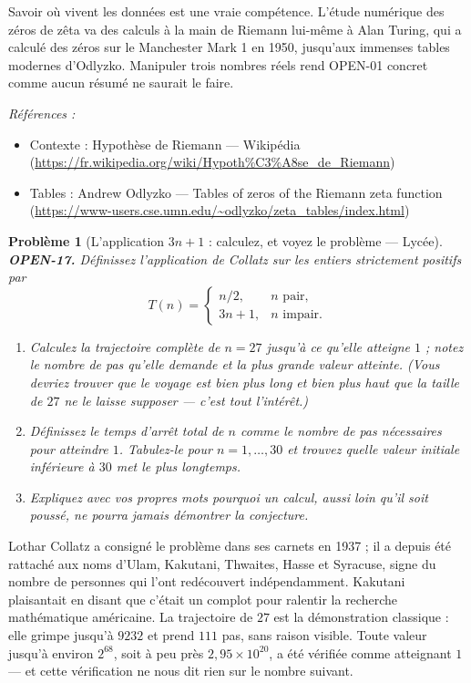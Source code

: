 \documentclass[11pt]{article}
\newtheorem{problem}{Problème}
\newenvironment{refs}{\par\small\noindent\emph{Références :}\begin{itemize}\setlength\itemsep{0pt}}{\end{itemize}\normalsize}
\begin{document}
\noindent Savoir où vivent les données est une vraie compétence. L'étude
numérique des zéros de zêta va des calculs à la main de Riemann lui-même à Alan Turing,
qui a calculé des zéros sur le Manchester Mark 1 en 1950, jusqu'aux immenses tables
modernes d'Odlyzko. Manipuler trois nombres réels rend OPEN-01 concret comme aucun résumé
ne saurait le faire.

\begin{refs}
\item Contexte : Hypothèse de Riemann --- Wikipédia (\url{https://fr.wikipedia.org/wiki/Hypoth%C3%A8se_de_Riemann})
\item Tables : Andrew Odlyzko --- Tables of zeros of the Riemann zeta function (\url{https://www-users.cse.umn.edu/~odlyzko/zeta_tables/index.html})
\end{refs}

\bigskip

\begin{problem}[{L'application $ 3n+1 $ : calculez, et voyez le problème --- Lycée}]
\textbf{OPEN-17.} Définissez l'application de Collatz sur les entiers strictement
positifs par
\[ T(n) = \begin{cases} n/2, & n \text{ pair},\\ 3n+1, & n \text{ impair}.\end{cases} \]
\begin{enumerate}
\item[(a)] Calculez la trajectoire complète de $ n = 27 $ jusqu'à ce qu'elle atteigne $ 1 $ ;
notez le nombre de pas qu'elle demande et la plus grande valeur atteinte. (Vous devriez
trouver que le voyage est bien plus long et bien plus haut que la taille de $ 27 $ ne le
laisse supposer --- c'est tout l'intérêt.)
\item[(b)] Définissez le \textit{temps d'arrêt total} de $ n $ comme le nombre de pas nécessaires
pour atteindre $ 1 $. Tabulez-le pour $ n = 1, \dots, 30 $ et trouvez quelle valeur
initiale inférieure à $ 30 $ met le plus longtemps.
\item[(c)] Expliquez avec vos propres mots pourquoi un calcul, aussi loin qu'il soit poussé, ne
pourra jamais démontrer la conjecture.
\end{enumerate}

\end{problem}

\noindent Lothar Collatz a consigné le problème dans ses carnets en 1937 ; il a
depuis été rattaché aux noms d'Ulam, Kakutani, Thwaites, Hasse et Syracuse, signe du
nombre de personnes qui l'ont redécouvert indépendamment. Kakutani plaisantait en disant
que c'était un complot pour ralentir la recherche mathématique américaine. La trajectoire
de $ 27 $ est la démonstration classique : elle grimpe jusqu'à $ 9232 $ et prend
$ 111 $ pas, sans raison visible. Toute valeur jusqu'à environ $ 2^{68} $, soit à peu
près $ 2{,}95 \times 10^{20} $, a été vérifiée comme atteignant $ 1 $ --- et cette
vérification ne nous dit rien sur le nombre suivant.
\end{document}
